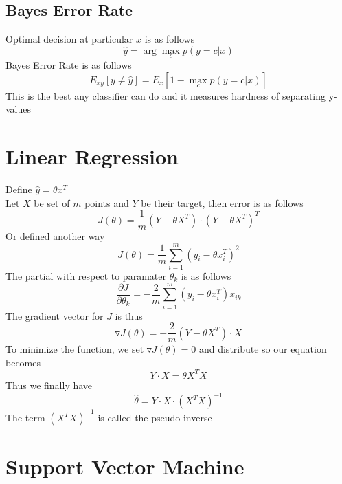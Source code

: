 \documentclass[twoside,11pt]{article}
\theoremstyle{definition}
\begin{document}
\subsection{Bayes Error Rate}

Optimal decision at particular $x$ is as follows
\[
\hat{y} = \arg \max_c p(y=c|x)
\]
Bayes Error Rate is as follows
\[
E_{xy} [y \neq \hat{y} ] = E_x [1 - \max_c p(y=c | x) ]
\]
This is the best any classifier can do and it measures hardness of separating y-values
\newpage
\section{Linear Regression}

Define $\hat{y} = \theta x^T$\\
Let $X$ be set of $m$ points and $Y$ be their target, then error is as follows
\[
J(\theta) = \frac{1}{m} (Y - \theta X^T) \cdot (Y- \theta X^T)^T
\]
Or defined another way
\[
J(\theta) = \frac{1}{m} \sum_{i=1}^m (y_i - \theta x_i^T)^2
\]
The partial with respect to paramater $\theta_k$ is as follows
\[
\frac{\partial J}{\partial \theta_k} = -\frac{2}{m} \sum_{i=1}^m (y_i - \theta x_i^T)x_{ik}
\]
The gradient vector for $J$ is thus
\[
\triangledown J(\theta) = -\frac{2}{m} (Y-\theta X^T) \cdot X
\]
To minimize the function, we set $\triangledown J(\theta) = 0$ and distribute so our equation becomes
\[
Y \cdot X = \theta X^T X
\]
Thus we finally have
\[
\hat{\theta} = Y \cdot X \cdot (X^T X)^{-1}
\]
The term $(X^T X)^{-1}$ is called the pseudo-inverse

\newpage

\section{Support Vector Machine}
\end{document}
